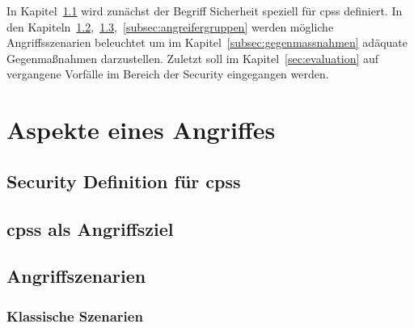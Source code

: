 \documentclass[final,bibliography=totocnumbered]{include/sikseminar}
\begin{document}
In Kapitel~\ref{subsec:definition} wird zunächst der Begriff Sicherheit speziell für \glspl{cps} definiert.
In den Kapiteln~\ref{subsec:angriffsziel},~\ref{subsec:angriffszenarien},~\ref{subsec:angreifergruppen} werden mögliche Angriffsszenarien beleuchtet um im Kapitel~\ref{subsec:gegenmassnahmen} adäquate Gegenmaßnahmen darzustellen.
Zuletzt soll im Kapitel~\ref{sec:evaluation} auf vergangene Vorfälle im Bereich der Security eingegangen werden.







\section{Aspekte eines Angriffes}\label{sec:aspekte}


\subsection{Security Definition f\"ur \glspl{cps}}\label{subsec:definition}


\subsection{\glspl{cps} als Angriffsziel}\label{subsec:angriffsziel}

\subsection{Angriffszenarien}\label{subsec:angriffszenarien}
\subsubsection{Klassische Szenarien}
\end{document}
